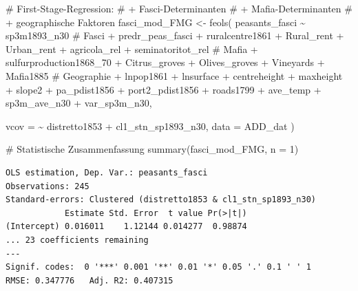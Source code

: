 \documentclass[
  a4paper,
  DIV=11,
  oneside]{scrreprt}
\newenvironment{Shaded}{\begin{snugshade}}{\end{snugshade}}
\newcommand{\AttributeTok}[1]{\textcolor[rgb]{0.40,0.45,0.13}{#1}}
\newcommand{\CommentTok}[1]{\textcolor[rgb]{0.37,0.37,0.37}{#1}}
\newcommand{\DecValTok}[1]{\textcolor[rgb]{0.68,0.00,0.00}{#1}}
\newcommand{\FunctionTok}[1]{\textcolor[rgb]{0.28,0.35,0.67}{#1}}
\newcommand{\NormalTok}[1]{\textcolor[rgb]{0.00,0.23,0.31}{#1}}
\newcommand{\OtherTok}[1]{\textcolor[rgb]{0.00,0.23,0.31}{#1}}
\newcommand{\SpecialCharTok}[1]{\textcolor[rgb]{0.37,0.37,0.37}{#1}}
\begin{document}
\begin{Shaded}
\begin{Highlighting}[]
\CommentTok{\# First{-}Stage{-}Regression:}
\CommentTok{\# + Fasci{-}Determinanten}
\CommentTok{\# + Mafia{-}Determinanten}
\CommentTok{\# + geographische Faktoren}
\NormalTok{fasci\_mod\_FMG }\OtherTok{\textless{}{-}} \FunctionTok{feols}\NormalTok{(}
\NormalTok{  peasants\_fasci }\SpecialCharTok{\textasciitilde{}} 
\NormalTok{    sp3m1893\_n30}
    \CommentTok{\# Fasci}
  \SpecialCharTok{+}\NormalTok{ predr\_peas\_fasci}
  \SpecialCharTok{+}\NormalTok{ ruralcentre1861}
  \SpecialCharTok{+}\NormalTok{ Rural\_rent}
  \SpecialCharTok{+}\NormalTok{ Urban\_rent}
  \SpecialCharTok{+}\NormalTok{ agricola\_rel}
  \SpecialCharTok{+}\NormalTok{ seminatoritot\_rel}
    \CommentTok{\# Mafia}
  \SpecialCharTok{+}\NormalTok{ sulfurproduction1868\_70}
  \SpecialCharTok{+}\NormalTok{ Citrus\_groves}
  \SpecialCharTok{+}\NormalTok{ Olives\_groves}
  \SpecialCharTok{+}\NormalTok{ Vineyards}
  \SpecialCharTok{+}\NormalTok{ Mafia1885}
    \CommentTok{\# Geographie}
  \SpecialCharTok{+}\NormalTok{ lnpop1861}
  \SpecialCharTok{+}\NormalTok{ lnsurface}
  \SpecialCharTok{+}\NormalTok{ centreheight}
  \SpecialCharTok{+}\NormalTok{ maxheight}
  \SpecialCharTok{+}\NormalTok{ slope2}
  \SpecialCharTok{+}\NormalTok{ pa\_pdist1856}
  \SpecialCharTok{+}\NormalTok{ port2\_pdist1856}
  \SpecialCharTok{+}\NormalTok{ roads1799}
  \SpecialCharTok{+}\NormalTok{ ave\_temp}
  \SpecialCharTok{+}\NormalTok{ sp3m\_ave\_n30}
  \SpecialCharTok{+}\NormalTok{ var\_sp3m\_n30,}
  
  \AttributeTok{vcov =} \SpecialCharTok{\textasciitilde{}}\NormalTok{ distretto1853 }\SpecialCharTok{+}\NormalTok{ cl1\_stn\_sp1893\_n30,}
  \AttributeTok{data =}\NormalTok{ ADD\_dat }
\NormalTok{) }

\CommentTok{\# Statistische Zusammenfassung}
\FunctionTok{summary}\NormalTok{(fasci\_mod\_FMG, }\AttributeTok{n =} \DecValTok{1}\NormalTok{)}
\end{Highlighting}
\end{Shaded}

\begin{verbatim}
OLS estimation, Dep. Var.: peasants_fasci
Observations: 245
Standard-errors: Clustered (distretto1853 & cl1_stn_sp1893_n30) 
            Estimate Std. Error  t value Pr(>|t|) 
(Intercept) 0.016011    1.12144 0.014277  0.98874 
... 23 coefficients remaining
---
Signif. codes:  0 '***' 0.001 '**' 0.01 '*' 0.05 '.' 0.1 ' ' 1
RMSE: 0.347776   Adj. R2: 0.407315
\end{verbatim}
\end{document}
